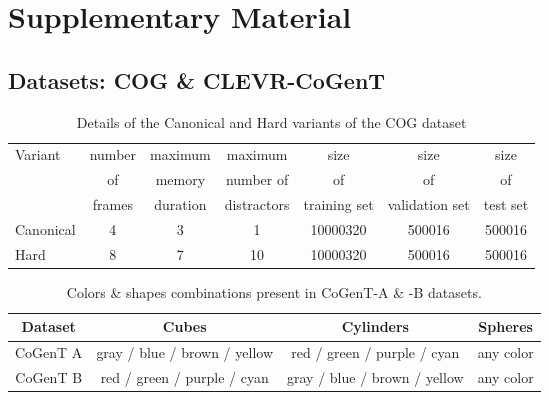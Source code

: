 \section{Supplementary Material}

\subsection{Datasets: COG \& CLEVR-CoGenT}
\label{sec:datasets-desc}

\begin{table}[ht]
	\caption{Details of the Canonical and Hard variants of the COG dataset}
	\centering
	\begin{adjustbox}{width=0.5\textwidth}
	\begin{tabular}{lcccccc}
		\toprule
		Variant    &  	number &  	maximum & maximum & size & size & size  \\ 
		& of   & memory & number of & of & of & of  \\
		& frames & duration & distractors & training set & validation set & test set \\
		\midrule
		Canonical & 4 & 3 & 1 & 10000320 & 500016 & 500016 \\	
		Hard  & 8 & 7 & 10 & 10000320 & 500016  & 500016 \\
		\bottomrule	
	\end{tabular}
	\end{adjustbox}
	\label{tab:cog_variants}
\end{table}

\begin{table}[ht]
	\caption{Colors \& shapes combinations present in CoGenT-A \& -B datasets.}
	\label{tab:cogent_conditions}
	\centering
	\begin{adjustbox}{width=0.5\textwidth}
	\begin{tabular}{cccc}
		\toprule
		Dataset        & Cubes              & Cylinders &  Spheres         \\
		\midrule
		CoGenT A & gray / blue / brown / yellow  & red / green / purple / cyan       &    any color  \\
		CoGenT B  & red / green / purple / cyan &   gray / blue / brown / yellow       &      any color  \\
		\bottomrule
	\end{tabular}
	\end{adjustbox}
\end{table}

